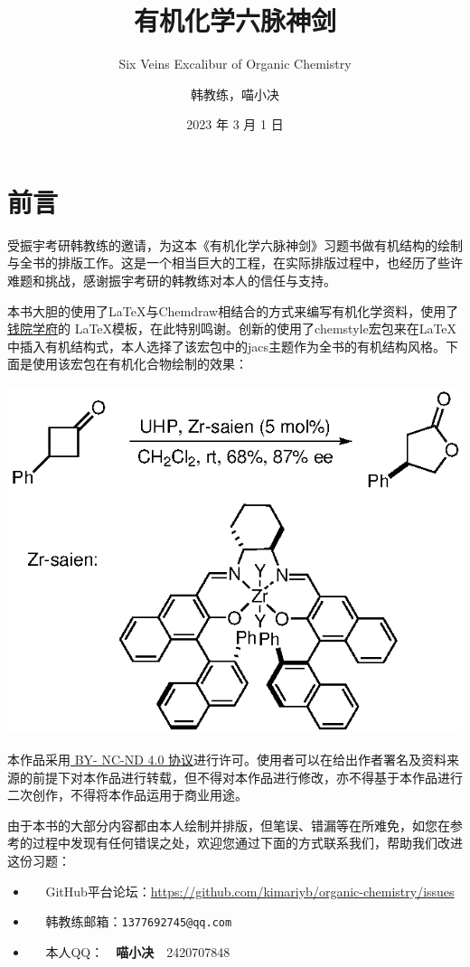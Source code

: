 \documentclass[
  10pt,
  twoside,
  openany,
  b5paper, %
  colorscheme = basic, %
]{qyxf-book}
\title{有机化学六脉神剑}
\subtitle{Six Veins Excalibur of Organic Chemistry }  %
\author{韩教练，喵小决}
\date{2023 年 3 月 1 日}
\begin{document}
\maketitle

\chapter*{前言}

受振宇考研韩教练的邀请，为这本《有机化学六脉神剑》习题书做有机结构的绘制与全书的排版工作。这是一个相当巨大的工程，在实际排版过程中，也经历了些许难题和挑战，感谢振宇考研的韩教练对本人的信任与支持。

本书大胆的使用了\LaTeX 与Chemdraw相结合的方式来编写有机化学资料，使用了\href{https://github.com/qyxf/qyxf-book}{钱院学府}的 \LaTeX 模板，在此特别鸣谢。创新的使用了chemstyle宏包来在\LaTeX 中插入有机结构式，本人选择了该宏包中的jacs主题作为全书的有机结构风格。下面是使用该宏包在有机化合物绘制的效果：

\begin{scheme}[ht]
	\includegraphics{eg/eg.eps}
\end{scheme}

本作品采用\href{https://
	creativecommons.org/licenses/
	by-nc-nd/4.0/}{ BY-
	NC-ND 4.0 协议}进行许可。使用者可以在给出作者署名及资料来源的前提下对本作品进行转载，但不得对本作品进行修改，亦不得基于本作品进行二次创作，不得将本作品运用于商业用途。

由于本书的大部分内容都由本人绘制并排版，但笔误、错漏等在所难免，如您在参考的过程中发现有任何错误之处，欢迎您通过下面的方式联系我们，帮助我们改进这份习题：
\begin{itemize}
	\item \faGithub ~~ GitHub平台论坛：\url{https://github.com/kimariyb/organic-chemistry/issues}
	\item \faEnvelopeOpen ~~ 韩教练邮箱：\texttt{1377692745@qq.com}
	\item \faQq ~~ 
	本人QQ：~~\textbf{喵小决}~~2420707848
\end{itemize}
\end{document}

